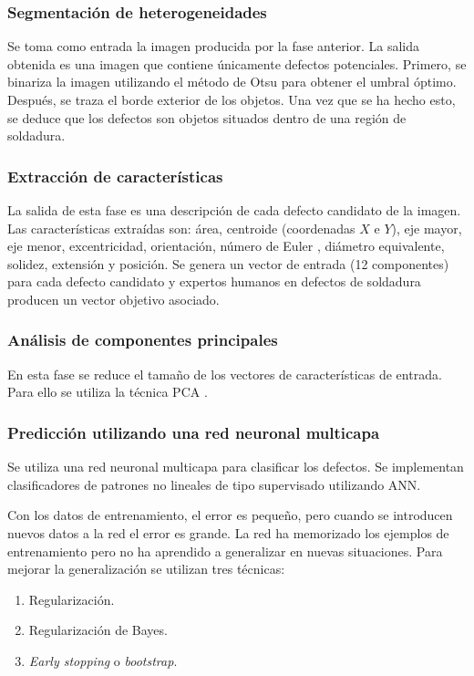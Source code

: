 \subsubsection{Segmentación de heterogeneidades}
Se toma como entrada la imagen producida por la fase anterior. 
La salida obtenida es una imagen que contiene únicamente defectos potenciales.
Primero, se binariza la imagen utilizando el método de Otsu para obtener el umbral óptimo. Después, se traza el borde exterior de los objetos. Una vez que se ha hecho esto, se deduce que los defectos son objetos situados dentro de una región de soldadura.


\subsubsection{Extracción de características}
La salida de esta fase es una descripción de cada defecto candidato de la imagen. Las características extraídas son: área, centroide (coordenadas $X$ e $Y$), eje mayor, eje menor, excentricidad, orientación, número de Euler \cite{dunham1999euler}, diámetro equivalente, solidez, extensión y posición. Se genera un vector de entrada (12 componentes) para cada defecto candidato y expertos humanos en defectos de soldadura producen un vector objetivo asociado.


\subsubsection{Análisis de componentes principales}
En esta fase se reduce el tamaño de los vectores de características de entrada. Para ello se utiliza la técnica PCA \cite{PCA}.


\subsubsection{Predicción utilizando una red neuronal multicapa}
Se utiliza una red neuronal multicapa para clasificar los defectos.
Se implementan clasificadores de patrones no lineales de tipo supervisado utilizando ANN.

Con los datos de entrenamiento, el error es pequeño, pero cuando se introducen nuevos datos a la red el error es grande. La red ha memorizado los ejemplos de entrenamiento pero no ha aprendido a generalizar en nuevas situaciones. Para mejorar la generalización se utilizan tres técnicas:
	\begin{enumerate}
	\item Regularización.
	\item Regularización de Bayes.
	\item \emph{Early stopping} o \emph{bootstrap}.
	\end{enumerate}

